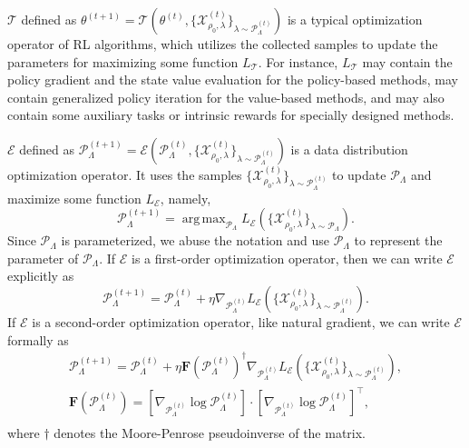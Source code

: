 \documentclass[nohyperref]{article}
\DeclareMathOperator*{\argmax}{arg\,max}
\theoremstyle{plain}
\begin{document}
$\mathcal{T}$ defined as $\theta^{(t+1)} 
= \mathcal{T}( \theta^{(t)}, \{\mathcal{X}^{(t)}_{\rho_0, \lambda}\}_{\lambda \sim \mathcal{P}^{(t)}_{\Lambda}} )$
is a typical optimization operator of RL algorithms, 
which utilizes the collected samples to update the parameters for maximizing some function $L_{\mathcal{T}}$.
For instance, $L_{\mathcal{T}}$ may contain the policy gradient and the state value evaluation for the policy-based methods, 
may contain generalized policy iteration for the value-based methods, 
and may also contain some auxiliary tasks or intrinsic rewards for specially designed methods.

$\mathcal{E}$ defined as $\mathcal{P}_{\Lambda}^{(t+1)}  
= \mathcal{E}(\mathcal{P}_{\Lambda}^{(t)}, \{\mathcal{X}^{(t)}_{\rho_0, \lambda}\}_{\lambda \sim \mathcal{P}^{(t)}_{\Lambda}} )$ 
is a data distribution optimization operator.
It uses the samples $\{\mathcal{X}^{(t)}_{\rho_0, \lambda}\}_{\lambda \sim \mathcal{P}^{(t)}_{\Lambda}}$ to update $\mathcal{P}_{\Lambda}$ and maximize some function $L_{\mathcal{E}}$, namely,
\begin{equation*}
    \mathcal{P}_{\Lambda}^{(t+1)} = \argmax_{\mathcal{P}_{\Lambda}} L_{\mathcal{E}} (\{\mathcal{X}^{(t)}_{\rho_0, \lambda}\}_{\lambda \sim \mathcal{P}_{\Lambda}}).
\end{equation*}
Since $\mathcal{P}_{\Lambda}$ is parameterized,  we abuse the notation and use $\mathcal{P}_{\Lambda}$ to represent the parameter of $\mathcal{P}_{\Lambda}$.
If $\mathcal{E}$ is a first-order optimization operator, then we can write $\mathcal{E}$ explicitly as
\begin{equation*}
    \mathcal{P}_{\Lambda}^{(t+1)} = \mathcal{P}_{\Lambda}^{(t)} + \eta \nabla_{\mathcal{P}_{\Lambda}^{(t)}} L_{\mathcal{E}} (\{\mathcal{X}^{(t)}_{\rho_0, \lambda}\}_{\lambda \sim \mathcal{P}^{(t)}_{\Lambda}}).
\end{equation*}
If $\mathcal{E}$ is a second-order optimization operator, like natural gradient, we can write $\mathcal{E}$ formally as
    \begin{gather*}
        \mathcal{P}_{\Lambda}^{(t+1)} = \mathcal{P}_{\Lambda}^{(t)} + \eta
        \textbf{F}(\mathcal{P}_{\Lambda}^{(t)})^\dagger
        \nabla_{\mathcal{P}_{\Lambda}^{(t)}} L_{\mathcal{E}} (\{\mathcal{X}^{(t)}_{\rho_0, \lambda}\}_{\lambda \sim \mathcal{P}^{(t)}_{\Lambda}}), \\
        \textbf{F}(\mathcal{P}_{\Lambda}^{(t)}) = \left[\nabla_{\mathcal{P}_{\Lambda}^{(t)}} \log \mathcal{P}_{\Lambda}^{(t)} \right]
        \cdot
        \left[\nabla_{\mathcal{P}_{\Lambda}^{(t)}} \log \mathcal{P}_{\Lambda}^{(t)} \right]^\top, \\
    \end{gather*}
where $\dagger$ denotes the Moore-Penrose pseudoinverse of the matrix.
\end{document}
